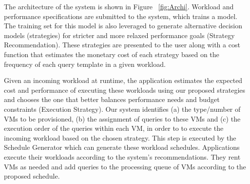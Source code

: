 The architecture of the system is shown in Figure ~\ref{fig:Archi}. Workload and performance specifications are submitted to the system, which trains a model. The training set for this model is also leveraged to generate alternative decision models (strategies) for stricter and more relaxed performance goals (Strategy Recommendation). These strategies are presented to the user along with a cost function that estimates the monetary cost of each strategy based on the frequency of each query template in a given workload.

Given an incoming workload at runtime, the application estimates the expected cost and performance of executing these workloads using our proposed strategies and chooses the one that better balances performance needs and budget constraints (Execution Strategy). Our system identifies (a) the type/number of VMs to be provisioned, (b) the assignment of queries to these VMs and (c) the execution order of the queries within each VM, in order to to execute the incoming workload based on the chosen strategy. This step is executed by the Schedule Generator which can generate these workload schedules. Applications execute their workloads according to the system’s recommendations. They rent VMs as needed and add queries to the processing queue of VMs according to the proposed schedule. 
